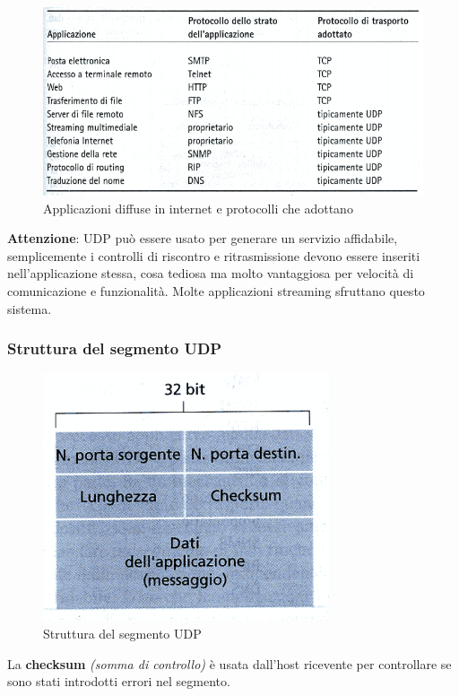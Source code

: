 \documentclass[11pt,a4paper]{article}
\begin{document}
\begin{figure}
	\includegraphics[scale=0.6]{img/014.png}
	\caption{Applicazioni diffuse in internet e protocolli che adottano}
\end{figure}
\textbf{Attenzione}: UDP può essere usato per generare un servizio affidabile, semplicemente i controlli di riscontro e ritrasmissione devono essere inseriti nell'applicazione stessa, cosa tediosa ma molto vantaggiosa per velocità di comunicazione e funzionalità. Molte applicazioni streaming sfruttano questo sistema. \\
\subsubsection{Struttura del segmento UDP}

\begin{figure}
	\begin{center}
		\includegraphics[scale=1]{img/015.png}
		\caption{Struttura del segmento UDP}
	\end{center}
\end{figure}

La \textbf{checksum} \textit{(somma di controllo)} è usata dall'host ricevente per controllare se sono stati introdotti errori nel segmento.
\end{document}
